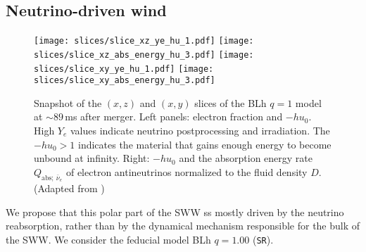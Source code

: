 \subsection{Neutrino-driven wind} \label{sec:bns_sims:nwind}

\begin{figure*}[t]
    \centering 
    \texttt{[image: slices/slice\_xz\_ye\_hu\_1.pdf]}
    \texttt{[image: slices/slice\_xz\_abs\_energy\_hu\_3.pdf]}
    \texttt{[image: slices/slice\_xy\_ye\_hu\_1.pdf]}
    \texttt{[image: slices/slice\_xy\_abs\_energy\_hu\_3.pdf]}
    \caption{Snapshot of the $(x,z)$ and $(x,y)$ slices of the BLh $q=1$ model at 
        ${\sim}89\,$ms after merger. Left panels: electron fraction and
        $-hu_0$. High $Y_e$ values indicate neutrino
        postprocessing and irradiation. The $-hu_0>1$ indicates the
        material that gains enough energy to become unbound at
        infinity. 
        Right: $-hu_0$ and the absorption energy rate $Q_{\text{abs};\:\bar{\nu}_e}$ 
        of electron antineutrinos normalized to the fluid density $D$.
        (Adapted from \citet{Nedora:2020pak})
    }
    \label{fig:slice:heating_hu}
\end{figure*}


We propose that this polar part of the \ac{SWW} ss mostly driven by the neutrino 
reabsorption, rather than by the dynamical mechanism responsible for the bulk of the 
\ac{SWW}. 
We consider the feducial model BLh $q=1.00$ (\texttt{SR}). 


